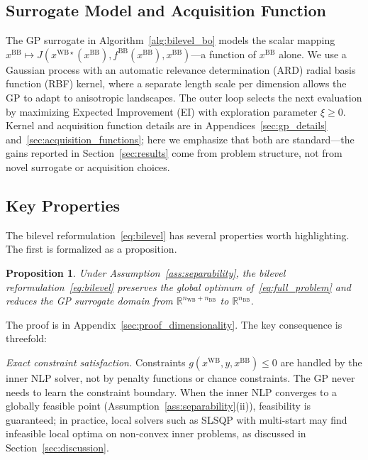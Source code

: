 \documentclass[12pt,a4paper]{article}%
\theoremstyle{plain}%
\newtheorem{proposition}[theorem]{Proposition}%
\theoremstyle{remark}%
\theoremstyle{definition}%
\def\WB{\mathrm{WB}}
\def\BB{\mathrm{BB}}
\begin{document}
\subsection{Surrogate Model and Acquisition Function}\label{subsec:surrogate_and_acquisition}

The GP surrogate in Algorithm~\ref{alg:bilevel_bo} models the scalar mapping $x^{\BB} \mapsto J(x^{\WB\star}(x^{\BB}), f^{\BB}(x^{\BB}), x^{\BB})$---a function of $x^{\BB}$ alone. We use a Gaussian process with an automatic relevance determination (ARD) radial basis function (RBF) kernel, where a separate length scale per dimension allows the GP to adapt to anisotropic landscapes. The outer loop selects the next evaluation by maximizing Expected Improvement (EI) with exploration parameter $\xi \geq 0$. Kernel and acquisition function details are in Appendices~\ref{sec:gp_details} and~\ref{sec:acquisition_functions}; here we emphasize that both are standard---the gains reported in Section~\ref{sec:results} come from problem structure, not from novel surrogate or acquisition choices.

\subsection{Key Properties}\label{subsec:key_properties}

The bilevel reformulation~\eqref{eq:bilevel} has several properties worth highlighting. The first is formalized as a proposition.

\begin{proposition}\label{prop:dimensionality}
Under Assumption~\ref{ass:separability}, the bilevel reformulation~\eqref{eq:bilevel} preserves the global optimum of~\eqref{eq:full_problem} and reduces the GP surrogate domain from $\mathbb{R}^{n_{\WB}+n_{\BB}}$ to $\mathbb{R}^{n_{\BB}}$.
\end{proposition}

\noindent The proof is in Appendix~\ref{sec:proof_dimensionality}. The key consequence is threefold:

\emph{Exact constraint satisfaction.} Constraints $g(x^{\WB}, y, x^{\BB}) \leq 0$ are handled by the inner NLP solver, not by penalty functions or chance constraints. The GP never needs to learn the constraint boundary. When the inner NLP converges to a globally feasible point (Assumption~\ref{ass:separability}(ii)), feasibility is guaranteed; in practice, local solvers such as SLSQP with multi-start may find infeasible local optima on non-convex inner problems, as discussed in Section~\ref{sec:discussion}.
\end{document}
